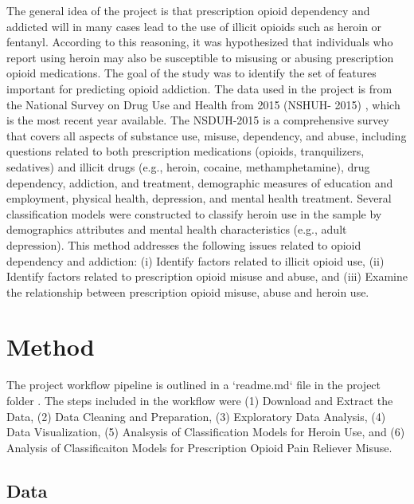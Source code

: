 \documentclass[sigconf]{acmart}
\begin{document}
The general idea of the project is that prescription opioid dependency and
addicted will in many cases lead to the use of illicit opioids such as heroin 
or fentanyl. According to this reasoning, it was hypothesized that individuals 
who report using heroin may also be susceptible to misusing or abusing 
prescription opioid medications. The goal of the study was to identify the set 
of features important for predicting opioid addiction. The data used in the 
project is from the National Survey on Drug Use and Health from 2015 (NSHUH-
2015) \cite{samhsa16}, which is the most recent year available. The NSDUH-2015 
is a comprehensive survey that covers all aspects of substance use, misuse, 
dependency, and abuse, including questions related to both prescription 
medications (opioids, tranquilizers, sedatives) and illicit drugs (e.g., 
heroin, cocaine, methamphetamine), drug dependency, addiction, and treatment, 
demographic measures of education and employment, physical health, depression, 
and mental health treatment. Several classification models were constructed to 
classify heroin use in the sample by demographics attributes and mental health 
characteristics (e.g., adult depression). This method addresses the following
issues related to opioid dependency and addiction: (i) Identify factors related 
to illicit opioid use, (ii) Identify factors related to prescription opioid 
misuse and abuse, and (iii) Examine the relationship between prescription 
opioid misuse, abuse and heroin use. 


\section{Method}

The project workflow pipeline is outlined in a `readme.md` file in the project 
folder \cite{pipeline17}. The steps included in the workflow were (1) Download
and Extract the Data, (2) Data Cleaning and Preparation, (3) Exploratory Data 
Analysis, (4) Data Visualization, (5) Analsysis of Classification Models for 
Heroin Use, and (6) Analysis of Classificaiton Models for Prescription Opioid 
Pain Reliever Misuse.

\subsection{Data} 
\end{document}
